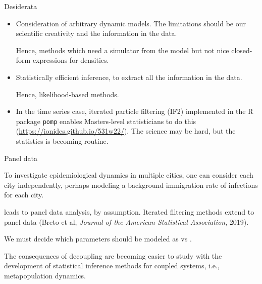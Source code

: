 \documentclass{beamer}
\begin{document}
\begin{frame}{Desiderata}

  \begin{itemize}
    \item Consideration of arbitrary dynamic models. The limitations should be our scientific creativity and the information in the data.

      \vspace{2mm}
      
     Hence,  methods which need a simulator from the model but not nice closed-form expressions for densities.

    \item Statistically efficient inference, to extract all the information in the data.

      \vspace{2mm}
      
    Hence, likelihood-based methods.

      \item  In the time series case, iterated particle filtering (IF2) implemented in the R package \texttt{pomp} enables Masters-level statisticians to do this (\url{https://ionides.github.io/531w22/}). The science may be hard, but the statistics is becoming routine.
      \end{itemize}
  \end{frame}



\begin{frame}{Panel data}

\bi
\item To investigate epidemiological dynamics in multiple cities, one can consider each city independently, perhaps modeling a background immigration rate of infections for each city.

\item {} leads to panel data analysis, by assumption. Iterated filtering methods extend to panel data (Breto et al, {\it Journal of the American Statistical Association}, 2019).

\item We must decide which parameters should be modeled as  vs .

\item The consequences of decoupling are becoming easier to study with the development of statistical inference methods for coupled systems, i.e., metapopulation dynamics.

  \ei

  \end{frame}
\end{document}
